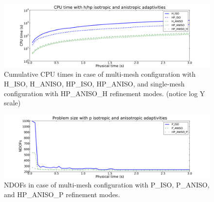 \begin{figure}[!ht]
  \begin{centering}
  \includegraphics[width=\columnwidth]{isoaniso_cpu}
  \caption{\label{fig:isoanisocpu} Cumulative CPU times in case 
  of multi-mesh configuration with H\_ISO, H\_ANISO,
  HP\_ISO, HP\_ANISO, and single-mesh configuration with HP\_ANISO\_H
  refinement modes. (notice log Y scale)}
  \end{centering}
\end{figure}

\begin{figure}[!ht]
  \begin{centering}
  \includegraphics[width=\columnwidth]{isoanisop_dof}
  \caption{\label{fig:isoanisopdof} NDOFs in case 
  of multi-mesh configuration with P\_ISO, P\_ANISO, and
  HP\_ANISO\_P refinement modes.}
  \end{centering}
\end{figure}


